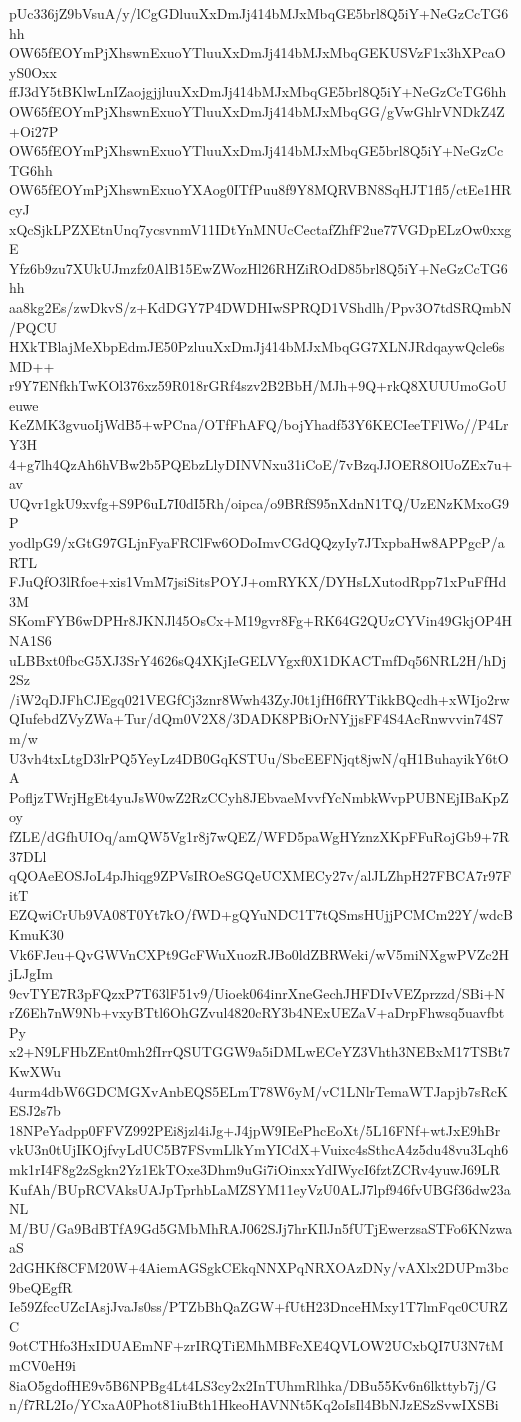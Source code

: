 pUc336jZ9bVsuA/y/lCgGDluuXxDmJj414bMJxMbqGE5brl8Q5iY+NeGzCcTG6hh
OW65fEOYmPjXhswnExuoYTluuXxDmJj414bMJxMbqGEKUSVzF1x3hXPcaOyS0Oxx
ffJ3dY5tBKlwLnIZaojgjjluuXxDmJj414bMJxMbqGE5brl8Q5iY+NeGzCcTG6hh
OW65fEOYmPjXhswnExuoYTluuXxDmJj414bMJxMbqGG/gVwGhlrVNDkZ4Z+Oi27P
OW65fEOYmPjXhswnExuoYTluuXxDmJj414bMJxMbqGE5brl8Q5iY+NeGzCcTG6hh
OW65fEOYmPjXhswnExuoYXAog0ITfPuu8f9Y8MQRVBN8SqHJT1fl5/ctEe1HRcyJ
xQcSjkLPZXEtnUnq7ycsvnmV11IDtYnMNUcCectafZhfF2ue77VGDpELzOw0xxgE
Yfz6b9zu7XUkUJmzfz0AlB15EwZWozHl26RHZiROdD85brl8Q5iY+NeGzCcTG6hh
aa8kg2Es/zwDkvS/z+KdDGY7P4DWDHIwSPRQD1VShdlh/Ppv3O7tdSRQmbN/PQCU
HXkTBlajMeXbpEdmJE50PzluuXxDmJj414bMJxMbqGG7XLNJRdqaywQcle6sMD++
r9Y7ENfkhTwKOl376xz59R018rGRf4szv2B2BbH/MJh+9Q+rkQ8XUUUmoGoUeuwe
KeZMK3gvuoIjWdB5+wPCna/OTfFhAFQ/bojYhadf53Y6KECIeeTFlWo//P4LrY3H
4+g7lh4QzAh6hVBw2b5PQEbzLlyDINVNxu31iCoE/7vBzqJJOER8OlUoZEx7u+av
UQvr1gkU9xvfg+S9P6uL7I0dI5Rh/oipca/o9BRfS95nXdnN1TQ/UzENzKMxoG9P
yodlpG9/xGtG97GLjnFyaFRClFw6ODoImvCGdQQzyIy7JTxpbaHw8APPgcP/aRTL
FJuQfO3lRfoe+xis1VmM7jsiSitsPOYJ+omRYKX/DYHsLXutodRpp71xPuFfHd3M
SKomFYB6wDPHr8JKNJl45OsCx+M19gvr8Fg+RK64G2QUzCYVin49GkjOP4HNA1S6
uLBBxt0fbcG5XJ3SrY4626sQ4XKjIeGELVYgxf0X1DKACTmfDq56NRL2H/hDj2Sz
/iW2qDJFhCJEgq021VEGfCj3znr8Wwh43ZyJ0t1jfH6fRYTikkBQcdh+xWIjo2rw
QIufebdZVyZWa+Tur/dQm0V2X8/3DADK8PBiOrNYjjsFF4S4AcRnwvvin74S7m/w
U3vh4txLtgD3lrPQ5YeyLz4DB0GqKSTUu/SbcEEFNjqt8jwN/qH1BuhayikY6tOA
PofljzTWrjHgEt4yuJsW0wZ2RzCCyh8JEbvaeMvvfYcNmbkWvpPUBNEjIBaKpZoy
fZLE/dGfhUIOq/amQW5Vg1r8j7wQEZ/WFD5paWgHYznzXKpFFuRojGb9+7R37DLl
qQOAeEOSJoL4pJhiqg9ZPVsIROeSGQeUCXMECy27v/alJLZhpH27FBCA7r97FitT
EZQwiCrUb9VA08T0Yt7kO/fWD+gQYuNDC1T7tQSmsHUjjPCMCm22Y/wdcBKmuK30
Vk6FJeu+QvGWVnCXPt9GcFWuXuozRJBo0ldZBRWeki/wV5miNXgwPVZc2HjLJgIm
9cvTYE7R3pFQzxP7T63lF51v9/Uioek064inrXneGechJHFDIvVEZprzzd/SBi+N
rZ6Eh7nW9Nb+vxyBTtl6OhGZvul4820cRY3b4NExUEZaV+aDrpFhwsq5uavfbtPy
x2+N9LFHbZEnt0mh2fIrrQSUTGGW9a5iDMLwECeYZ3Vhth3NEBxM17TSBt7KwXWu
4urm4dbW6GDCMGXvAnbEQS5ELmT78W6yM/vC1LNlrTemaWTJapjb7sRcKESJ2s7b
18NPeYadpp0FFVZ992PEi8jzl4iJg+J4jpW9IEePhcEoXt/5L16FNf+wtJxE9hBr
vkU3n0tUjIKOjfvyLdUC5B7FSvmLlkYmYICdX+Vuixc4sSthcA4z5du48vu3Lqh6
mk1rI4F8g2zSgkn2Yz1EkTOxe3Dhm9uGi7iOinxxYdIWycI6fztZCRv4yuwJ69LR
KufAh/BUpRCVAksUAJpTprhbLaMZSYM11eyVzU0ALJ7lpf946fvUBGf36dw23aNL
M/BU/Ga9BdBTfA9Gd5GMbMhRAJ062SJj7hrKIlJn5fUTjEwerzsaSTFo6KNzwaaS
2dGHKf8CFM20W+4AiemAGSgkCEkqNNXPqNRXOAzDNy/vAXlx2DUPm3bc9beQEgfR
Ie59ZfccUZcIAsjJvaJs0ss/PTZbBhQaZGW+fUtH23DnceHMxy1T7lmFqc0CURZC
9otCTHfo3HxIDUAEmNF+zrIRQTiEMhMBFcXE4QVLOW2UCxbQI7U3N7tMmCV0eH9i
8iaO5gdofHE9v5B6NPBg4Lt4LS3cy2x2InTUhmRlhka/DBu55Kv6n6lkttyb7j/G
n/f7RL2Io/YCxaA0Phot81iuBth1HkeoHAVNNt5Kq2oIsIl4BbNJzESzSvwIXSBi
